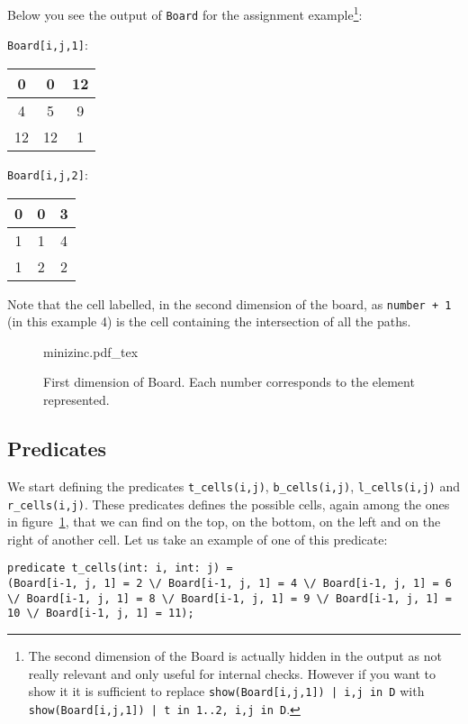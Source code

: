 Below you see the output of \texttt{Board} for the assignment example\footnote{The second dimension of the Board is actually hidden in the output as not really relevant and only useful for internal checks. However if you want to show it it is sufficient to replace \texttt{show(Board[i,j,1]) | i,j in D} with \texttt{show(Board[i,j,1]) | t in 1..2, i,j in D}.}:


\texttt{Board[i,j,1]}:
\begin{center}
    \begin{tabular}{ |c|c|c| } 
     \hline
     0 &0 &12 \\
     \hline
4 &5 &9 \\
\hline
12 &12 &1 \\
     \hline
    \end{tabular}
    \end{center}

\texttt{Board[i,j,2]}:
    \begin{center}
    \begin{tabular}{ |c|c|c| } 
        \hline
        0 &0 &3 \\
        \hline
   1 &1 &4 \\
   \hline
   1 &2 &2 \\
        \hline
       \end{tabular}
    \end{center}
Note that the cell labelled, in the second dimension of the board, as \texttt{number + 1} (in this example 4) is the cell containing the intersection of all the paths.

\begin{figure}[htb]
    \centering
    \def\svgwidth{\columnwidth}
    {minizinc.pdf_tex}
    \caption{First dimension of Board. Each number corresponds to the element represented.}
    \label{figm:board}
\end{figure}

\subsection{Predicates}\label{subsec:predicates}
We start defining the predicates \texttt{t_cells(i,j)}, \texttt{b_cells(i,j)}, \texttt{l_cells(i,j)} and \texttt{r_cells(i,j)}. These predicates defines the possible cells, again among the ones in figure~\ref{figm:board}, that we can find on the top, on the bottom, on the left and on the right of another cell.
Let us take an example of one of this predicate:
\begin{verbatim}
predicate t_cells(int: i, int: j) =
(Board[i-1, j, 1] = 2 \/ Board[i-1, j, 1] = 4 \/ Board[i-1, j, 1] = 6 \/ Board[i-1, j, 1] = 8 \/ Board[i-1, j, 1] = 9 \/ Board[i-1, j, 1] = 10 \/ Board[i-1, j, 1] = 11);
\end{verbatim}

